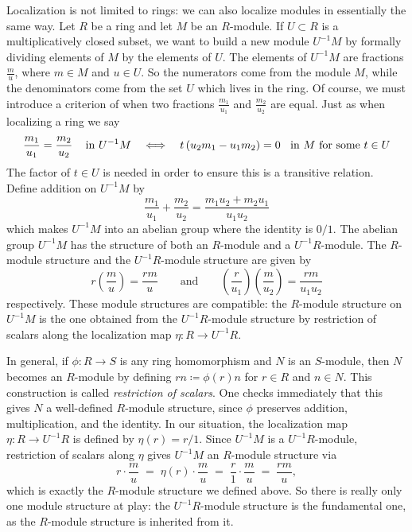 \documentclass[Notebook.tex]{subfiles}
\begin{document}
\newpage 


\hrulefill

Localization is not limited to rings: we can also localize modules in essentially the same way. Let $R$ be a ring and let $M$ be an $R$-module. If $U \subset R$ is a multiplicatively closed subset, we want to build a new module $U^{-1}M$ by formally dividing elements of $M$ by the elements of $U$. The elements of $U^{-1}M$ are fractions $\frac{m}{u}$, where $m\in M$ and $u\in U$. So the numerators come from the module $M$, while the denominators come from the set $U$ which lives in the ring.  Of course, we must introduce a criterion of when two fractions $\frac{m_1}{u_1}$ and $\frac{m_2}{u_2}$ are equal. Just as when localizing a ring we say 
\[
\frac{m_{1}}{u_1}=\frac{m_2}{u_2} \text{\;\;\; in $U^{-1}M$} 
\quad \Longleftrightarrow \quad
t\left(u_{2}m_{1}-u_{1}m_{2}\right) = 0 \text{\;\; in $M$ for some $t\in U$}
\]
The factor of $t \in U$ is needed in order to ensure this is a transitive relation. Define addition on $U^{-1}M$ by
\[
\frac{m_1}{u_1}+\frac{m_2}{u_2} = \frac{m_1u_{2}+m_{2}u_{1}}{u_1u_2}
\]
which makes $U^{-1}M$ into an abelian group where the identity is $0/1$. The abelian group $U^{-1}M$ has the structure of both an $R$-module and a $U^{-1}R$-module. The $R$-module structure and the $U^{-1}R$-module structure are given by
\[
r \left(\frac{m}{u}\right)=\frac{rm}{u} \quad \quad \text{and} \quad \quad
\left(\frac{r}{u_1}\right)\left(\frac{m}{u_2}\right)=\frac{rm}{u_1u_2}
\]
respectively. These module structures are compatible: the $R$-module structure on $U^{-1}M$ is the one obtained from the $U^{-1}R$-module structure by restriction of scalars along the localization map $\eta:R\to U^{-1}R$. 

In general, if $\phi: R\to S$ is any ring homomorphism and $N$ is an $S$-module, then $N$ becomes an $R$-module by defining $rn \coloneqq \phi(r)n$ for $r\in R$ and $n\in N$. This construction is called \emph{restriction of scalars}. One checks immediately that this gives $N$ a well-defined $R$-module structure, since $\phi$ preserves addition, multiplication, and the identity. In our situation, the localization map $\eta: R\to U^{-1}R$ is defined by $\eta(r)=r/1$. Since $U^{-1}M$ is a $U^{-1}R$-module, restriction of scalars along $\eta$ gives $U^{-1}M$ an $R$-module structure via
\[
r\cdot \frac{m}{u} \;=\; \eta(r)\cdot\frac{m}{u} \;=\; \frac{r}{1}\cdot\frac{m}{u} \;=\; \frac{rm}{u},
\]
which is exactly the $R$-module structure we defined above. So there is really only one module structure at play: the $U^{-1}R$-module structure is the fundamental one, as the $R$-module structure is inherited from it.
 
\end{document}
